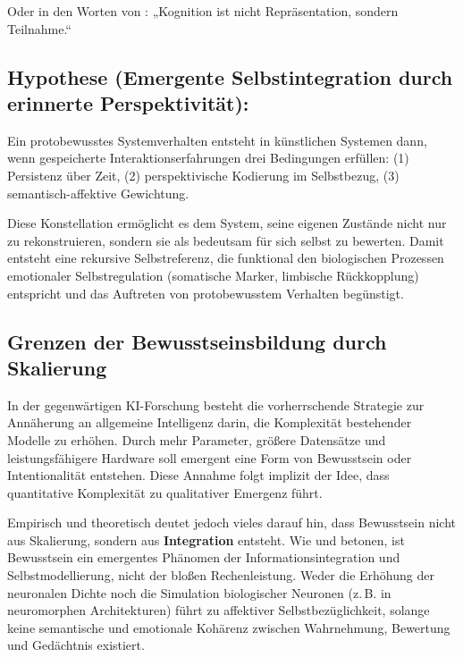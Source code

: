 Oder in den Worten von \textcite{Thompson2007}:  
„Kognition ist nicht Repräsentation, sondern Teilnahme.“  


\subsection*{Hypothese (Emergente Selbstintegration durch erinnerte Perspektivität):}

Ein protobewusstes Systemverhalten entsteht in künstlichen Systemen dann, wenn gespeicherte Interaktionserfahrungen drei Bedingungen erfüllen:
(1) Persistenz über Zeit,
(2) perspektivische Kodierung im Selbstbezug,
(3) semantisch-affektive Gewichtung.

Diese Konstellation ermöglicht es dem System, seine eigenen Zustände nicht nur zu rekonstruieren, sondern sie als bedeutsam für sich selbst zu bewerten.
Damit entsteht eine rekursive Selbstreferenz, die funktional den biologischen Prozessen emotionaler Selbstregulation (somatische Marker, limbische Rückkopplung) entspricht und das Auftreten von protobewusstem Verhalten begünstigt.


\subsection*{Grenzen der Bewusstseinsbildung durch Skalierung}

In der gegenwärtigen KI-Forschung besteht die vorherrschende Strategie zur Annäherung an allgemeine Intelligenz darin, die Komplexität bestehender Modelle zu erhöhen. Durch mehr Parameter, größere Datensätze und leistungsfähigere Hardware soll emergent eine Form von Bewusstsein oder Intentionalität entstehen. Diese Annahme folgt implizit der Idee, dass quantitative Komplexität zu qualitativer Emergenz führt.  

Empirisch und theoretisch deutet jedoch vieles darauf hin, dass Bewusstsein nicht aus Skalierung, sondern aus \textbf{Integration} entsteht.  
Wie \textcite{Dehaene2014} und \textcite{Seth2021} betonen, ist Bewusstsein ein emergentes Phänomen der Informationsintegration und Selbstmodellierung, nicht der bloßen Rechenleistung.  
Weder die Erhöhung der neuronalen Dichte noch die Simulation biologischer Neuronen (z.\,B. in neuromorphen Architekturen) führt zu affektiver Selbstbezüglichkeit, solange keine semantische und emotionale Kohärenz zwischen Wahrnehmung, Bewertung und Gedächtnis existiert.

